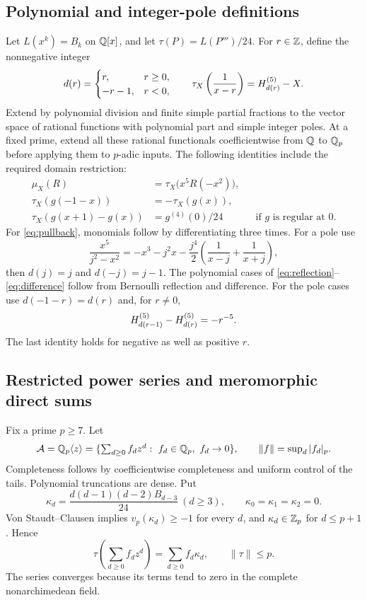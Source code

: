 \subsection{Polynomial and integer-pole definitions}
Let $L(x^k)=B_k$ on $\mathbb Q[x]$, and let $\tau(P)=L(P''')/24$. For $r\in\mathbb Z$,
define the nonnegative integer
\[
 d(r)=\begin{cases}r,&r\ge0,\\-r-1,&r<0,\end{cases}\qquad
 \tau_X\left(\frac1{x-r}\right)=H^{(5)}_{d(r)}-X.
\]
Extend by polynomial division and finite simple partial fractions to the
vector space of rational functions with polynomial part and simple integer
poles. At a fixed prime, extend all these rational functionals coefficientwise
from $\mathbb Q$ to $\mathbb Q_p$ before applying them to $p$-adic inputs. The following identities include the required domain restriction:
\begin{align}
 \mu_X(R)&=\tau_X\bigl(x^5R(-x^2)\bigr),\label{eq:pullback}\\
 \tau_X(g(-1-x))&=-\tau_X(g(x)),\label{eq:reflection}\\
 \tau_X(g(x+1)-g(x))&=g^{(4)}(0)/24
                  &&\text{if $g$ is regular at $0$}.\label{eq:difference}
\end{align}
For \eqref{eq:pullback}, monomials follow by differentiating three times.
For a pole use
\[
 \frac{x^5}{j^2-x^2}=-x^3-j^2x-\frac{j^4}{2}
          \left(\frac1{x-j}+\frac1{x+j}\right),
\]
then $d(j)=j$ and $d(-j)=j-1$. The polynomial cases of
\eqref{eq:reflection}--\eqref{eq:difference} follow from Bernoulli
reflection and difference. For the pole cases use $d(-1-r)=d(r)$ and,
for $r\ne0$,
\[
 H^{(5)}_{d(r-1)}-H^{(5)}_{d(r)}=-r^{-5}.
\]
The last identity holds for negative as well as positive $r$.

\subsection{Restricted power series and meromorphic direct sums}
Fix a prime $p\ge7$. Let
\[
 \mathcal A=\mathbb Q_p\langle z\rangle
 =\{\textstyle\sum_{d\ge0}f_dz^d:\ f_d\in\mathbb Q_p,\ f_d\to0\},
 \qquad \|f\|=\sup_d|f_d|_p.
\]
Completeness follows by coefficientwise completeness and uniform control
of the tails. Polynomial truncations are dense. Put
\[
 \kappa_d=\frac{d(d-1)(d-2)B_{d-3}}{24}\ (d\ge3),
 \qquad\kappa_0=\kappa_1=\kappa_2=0.
\]
Von Staudt--Clausen implies $v_p(\kappa_d)\ge-1$ for every $d$, and
$\kappa_d\in\mathbb Z_p$ for $d\le p+1$. Hence
\begin{equation}\label{eq:tauextseries}
 \tau\left(\sum_{d\ge0}f_dz^d\right)=\sum_{d\ge0}f_d\kappa_d,
 \qquad \|\tau\|\le p.
\end{equation}
The series converges because its terms tend to zero in the complete
nonarchimedean field.

